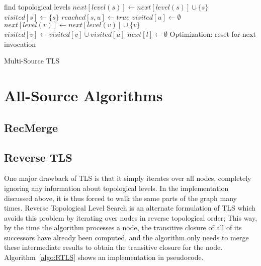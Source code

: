 \documentclass[12pt,a4paper,twoside]{article}
\DeclareMathOperator*{\argmin}{\arg\!\min}
\begin{document}
\begin{algorithm}
  \begin{algorithmic}
      \State find topological levels
        \State $next[level(s)] \gets next[level(s)] \cup \{s\}$
        \State $visited[s] \gets \{s\}$
      \EndFor
      \For{$l \gets \argmin_{s \in S} level(s), maxLevel$}
            \State $reached[s, u] \gets true$
          \EndFor
          \State $visited[u] \gets \emptyset$
              \State $next[level(v)] \gets next[level(v)] \cup \{v\}$
            \EndIf
            \State $visited[v] \gets visited[v] \cup visited[u]$
          \EndFor
        \EndFor
        \State $next[l] \gets \emptyset$ \Comment Optimization: reset for next invocation
      \EndFor
    \EndFunction
  \end{algorithmic}
  \caption{Multi-Source TLS}
  \label{algo:MultiTLS}
\end{algorithm}

\section{All-Source Algorithms}

\subsection{RecMerge}


\subsection{Reverse TLS}

One major drawback of TLS is that it simply iterates over all nodes, completely ignoring any information about topological levels. In the implementation discussed above, it is thus forced to walk the same parts of the graph many times. Reverse Topological Level Search is an alternate formulation of TLS which avoids this problem by iterating over nodes in reverse topological order; This way, by the time the algorithm processes a node, the transitive closure of all of its successors have already been computed, and the algorithm only needs to merge these intermediate results to obtain the transitive closure for the node. Algorithm~\ref{algo:RTLS} shows an implementation in pseudocode.
\end{document}
